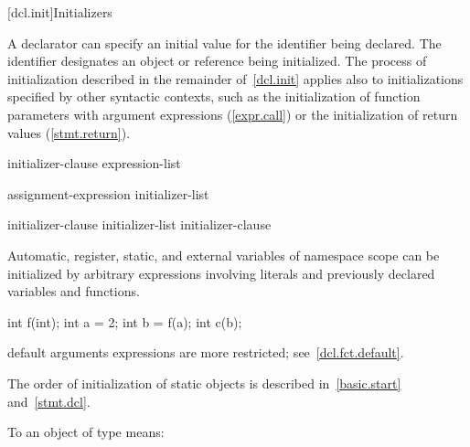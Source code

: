 [dcl.init]{Initializers}%

\pnum
A declarator can specify an initial value for the
identifier being declared.
The identifier designates an object or reference being initialized.
The process of initialization described in the
remainder of~\ref{dcl.init}
applies also to initializations
specified by other syntactic contexts, such as the initialization
of function parameters with argument expressions (\ref{expr.call}) or
the initialization of return values (\ref{stmt.return}).

\begin{bnf}
\br
    \terminal{=} initializer-clause\br
    \terminal{(} expression-list \terminal{)}
\end{bnf}

\begin{bnf}
\br
    assignment-expression\br
    \terminal{\{} initializer-list \terminal{,\opt} \terminal{\}}\br
    \terminal{\{} \terminal{\}}
\end{bnf}

\begin{bnf}
\br
    initializer-clause\br
    initializer-list \terminal{,} initializer-clause
\end{bnf}

\pnum
{}%
%
Automatic, register, static, and external variables of namespace scope
can be initialized by arbitrary expressions involving literals and
previously declared variables and functions.
\enterexample

\begin{codeblock}
int f(int);
int a = 2;
int b = f(a);
int c(b);
\end{codeblock}
\exitexampleb

\pnum
\enternote
default arguments expressions are more restricted; see~\ref{dcl.fct.default}.

\pnum
The order of initialization of static objects is described in~\ref{basic.start}
and~\ref{stmt.dcl}.
\exitnote

\pnum
{}%
%
%
%
To
an object of type
means:

